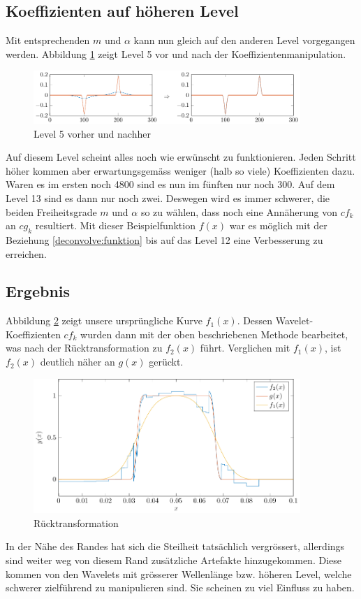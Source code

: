 \subsection{Koeffizienten auf höheren Level}

Mit entsprechenden $m$ und $\alpha$ kann nun gleich auf den anderen Level vorgegangen werden.
Abbildung \ref{deconvolve:level5} zeigt Level 5 vor und nach der Koeffizientenmanipulation.
\begin{figure}[h]
\centering
\includegraphics[width=0.9\textwidth]{./papers/deconvolve/pictures/level/level5.pdf}
\caption{Level 5 vorher und nachher\label{deconvolve:level5}}
\end{figure}

Auf diesem Level scheint alles noch wie erwünscht zu funktionieren.
Jeden Schritt höher kommen aber erwartungsgemäss weniger (halb so viele) Koeffizienten dazu.
Waren es im ersten noch 4800 sind es nun im fünften nur noch 300.
Auf dem Level 13 sind es dann nur noch zwei.
Deswegen wird es immer schwerer, die beiden Freiheitsgrade $m$ und $\alpha$ so zu wählen, dass noch eine Annäherung von $cf_k$ an $cg_k$ resultiert.
Mit dieser Beispielfunktion $f(x)$ war es möglich mit der Beziehung \eqref{deconvolve:funktion} bis auf das Level 12 eine Verbesserung zu erreichen.

\subsection{Ergebnis}
Abbildung \ref{deconvolve:result_1d} zeigt unsere ursprüngliche Kurve $f_1(x)$.
Dessen Wavelet-Koeffizienten $cf_k$ wurden dann mit der oben beschriebenen Methode bearbeitet, was nach der Rücktransformation zu $f_2(x)$ führt.
Verglichen mit $f_1(x)$, ist $f_2(x)$ deutlich näher an $g(x)$ gerückt.
\begin{figure}[h]
\centering
\includegraphics[width=0.9\textwidth]{./papers/deconvolve/pictures/result_1d.pdf}
\caption{Rücktransformation\label{deconvolve:result_1d}}
\end{figure}

In der Nähe des Randes hat sich die Steilheit tatsächlich vergrössert, allerdings sind weiter weg von diesem Rand zusätzliche Artefakte hinzugekommen.
Diese kommen von den Wavelets mit grösserer \glqq Wellenlänge \grqq{} bzw. höheren Level, welche schwerer zielführend zu manipulieren sind. Sie scheinen zu viel Einfluss zu haben.
